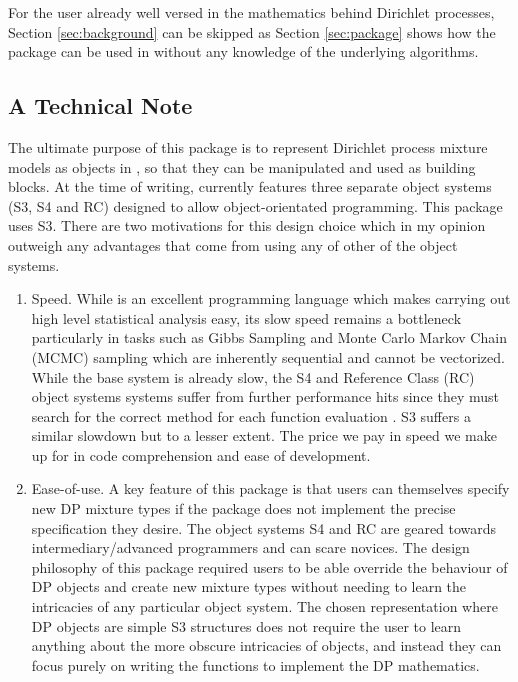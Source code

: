 \documentclass[nojss]{jss}
\begin{document}
For the user already well versed in the mathematics behind Dirichlet processes, Section \ref{sec:background} can be skipped as Section \ref{sec:package} shows how the package can be used in  without any knowledge of the underlying algorithms.

\subsection{A Technical Note}
The ultimate purpose of this package is to represent Dirichlet process mixture models as objects in , so that they can be manipulated and used as building blocks. At the time of writing,  currently features three separate object systems (S3, S4 and RC) designed to allow object-orientated programming. This package uses S3. There are two motivations for this design choice which in my opinion outweigh any advantages that come from using any of other of the  object systems.

\begin{enumerate}
\item Speed. While  is an excellent programming language which makes carrying out high level statistical analysis easy, its slow speed remains a bottleneck particularly in tasks such as Gibbs Sampling and Monte Carlo Markov Chain (MCMC) sampling which are inherently sequential and cannot be vectorized. While the base  system is already slow, the S4 and Reference Class (RC) object systems systems suffer from further performance hits since they must search for the correct method for each function evaluation \citep{wickham_advanced_2014}. S3 suffers a similar slowdown but to a lesser extent. The price we pay in speed we make up for in code comprehension and ease of development.

\item Ease-of-use. A key feature of this package is that users can themselves specify new DP mixture types if the package does not implement the precise specification they desire.  The object systems S4 and RC are geared towards intermediary/advanced  programmers and can scare novices. The design philosophy of this package required  users to be able override the behaviour of DP objects and create new mixture  types without needing to learn the intricacies of any particular object system.  The chosen representation where DP objects are simple S3 structures does not require the user to learn anything about the more obscure intricacies of  objects, and instead they can focus purely on writing the  functions to implement the DP mathematics.
\end{enumerate}
\end{document}

